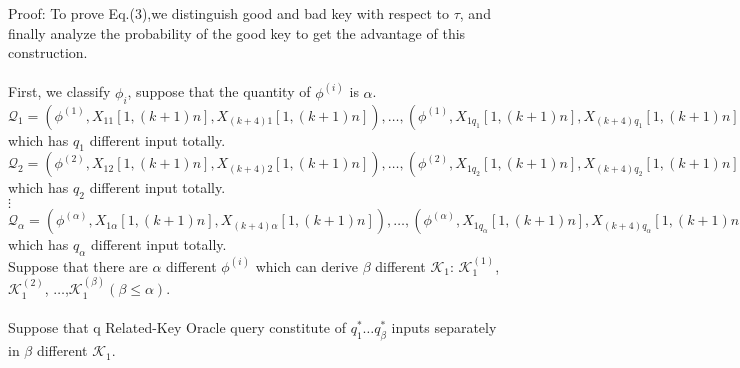 Proof:
To prove Eq.(3),we distinguish good and bad key with respect to $\tau$, and finally analyze the probability of the good key to get the advantage of this construction.\\
\\
First, we classify $\phi_{i}$, suppose that the quantity of $\phi^{(i)}$ is $\alpha$.\\
$\mathcal{Q}_{1}={(\phi^{(1)},X_{11}[1,(k+1)n],X_{(k+4)1}[1,(k+1)n]),\dots,(\phi^{(1)},X_{1q_{1}}[1,(k+1)n],X_{(k+4)q_{1}}[1,(k+1)n])}$ which has $q_{1}$ different input totally.\\
$\mathcal{Q}_{2}={(\phi^{(2)},X_{12}[1,(k+1)n],X_{(k+4)2}[1,(k+1)n]),\dots,(\phi^{(2)},X_{1q_{2}}[1,(k+1)n],X_{(k+4)q_{2}}[1,(k+1)n])}$    which has $q_{2}$ different input totally.\\
\quad \quad $\vdots$ \\
$\mathcal{Q}_{\alpha}={(\phi^{(\alpha)},X_{1\alpha}[1,(k+1)n],X_{(k+4)\alpha}[1,(k+1)n]),\dots,(\phi^{(\alpha)},X_{1q_{\alpha}}[1,(k+1)n],X_{(k+4)q_{\alpha}}[1,(k+1)n])}$ which has $q_{\alpha}$ different input totally.\\

Suppose that there are $\alpha$ different $\phi^{(i)}$ which can derive $\beta$ different $\mathcal{K}_{1}$: $\mathcal{K}_{1}^{(1)}$, $\mathcal{K}_{1}^{(2)}$, $\dots$,$\mathcal{K}_{1}^{(\beta)}$$(\beta\leq \alpha)$.\\\\
Suppose that q Related-Key Oracle query constitute of $q_{1}^{\ast} \dots q_{\beta}^{\ast}$ inputs separately in $\beta$ different $\mathcal{K}_{1}$.\\
\\

